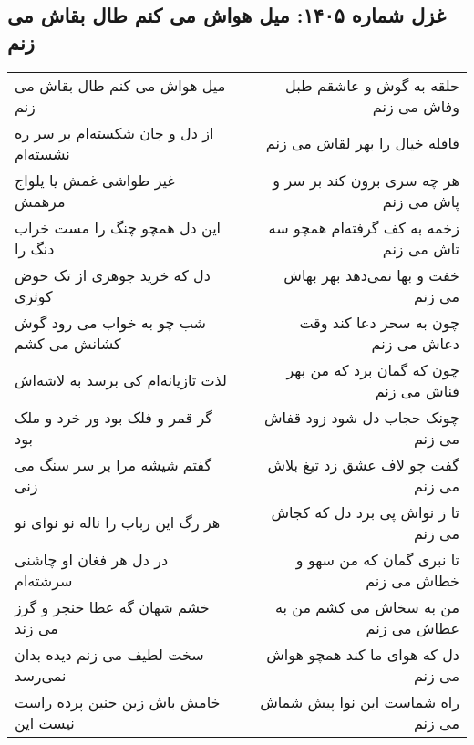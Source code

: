 \begin{center}
\section*{غزل شماره ۱۴۰۵: میل هواش می کنم طال بقاش می زنم}
\label{sec:1405}
\begin{longtable}{l p{0.5cm} r}
میل هواش می کنم طال بقاش می زنم
&&
حلقه به گوش و عاشقم طبل وفاش می زنم
\\
از دل و جان شکسته‌ام بر سر ره نشسته‌ام
&&
قافله خیال را بهر لقاش می زنم
\\
غیر طواشی غمش یا یلواج مرهمش
&&
هر چه سری برون کند بر سر و پاش می زنم
\\
این دل همچو چنگ را مست خراب دنگ را
&&
زخمه به کف گرفته‌ام همچو سه تاش می زنم
\\
دل که خرید جوهری از تک حوض کوثری
&&
خفت و بها نمی‌دهد بهر بهاش می زنم
\\
شب چو به خواب می رود گوش کشانش می کشم
&&
چون به سحر دعا کند وقت دعاش می زنم
\\
لذت تازیانه‌ام کی برسد به لاشه‌اش
&&
چون که گمان برد که من بهر فناش می زنم
\\
گر قمر و فلک بود ور خرد و ملک بود
&&
چونک حجاب دل شود زود قفاش می زنم
\\
گفتم شیشه مرا بر سر سنگ می زنی
&&
گفت چو لاف عشق زد تیغ بلاش می زنم
\\
هر رگ این رباب را ناله نو نوای نو
&&
تا ز نواش پی برد دل که کجاش می زنم
\\
در دل هر فغان او چاشنی سرشته‌ام
&&
تا نبری گمان که من سهو و خطاش می زنم
\\
خشم شهان گه عطا خنجر و گرز می زند
&&
من به سخاش می کشم من به عطاش می زنم
\\
سخت لطیف می زنم دیده بدان نمی‌رسد
&&
دل که هوای ما کند همچو هواش می زنم
\\
خامش باش زین حنین پرده راست نیست این
&&
راه شماست این نوا پیش شماش می زنم
\\
\end{longtable}
\end{center}
